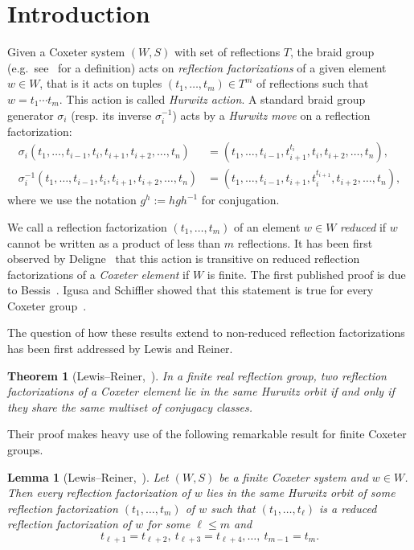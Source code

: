 \documentclass[10pt]{article}
\newtheorem*{thm*}{Theorem}
\newtheorem{lemma}[theorem]{Lemma}
\theoremstyle{definition}
\providecommand{\eg}{e.g.\ }
\begin{document}
\section{Introduction}\label{sec:intro}


Given a Coxeter system $(W,S)$ with set of reflections $T$, the braid group (\eg see~\cite{BDSW14} for a definition) acts on \emph{reflection factorizations} of a given element $w \in W$, that is it acts on tuples $(t_1, \ldots , t_m) \in T^m$ of reflections such that $w=t_1 \cdots t_m$. This action is called \emph{Hurwitz action}. A standard braid group generator $\sigma_i$ (resp. its inverse $\sigma_i^{-1}$) acts by a \emph{Hurwitz move} on a reflection factorization:
\begin{align*}
\sigma_i (t_1, \ldots , t_{i-1}, t_i, t_{i+1}, t_{i+2}, \ldots , t_n) & = (t_1, \ldots , t_{i-1}, t_{i+1}^{t_i}, t_{i}, t_{i+2}, \ldots , t_n),\\
\sigma_i^{-1} (t_1, \ldots , t_{i-1}, t_i, t_{i+1}, t_{i+2}, \ldots , t_n) & = (t_1, \ldots , t_{i-1}, t_{i+1}, t_{i}^{t_{i+1}}, t_{i+2}, \ldots , t_n),
\end{align*}
where we use the notation $g^h:=hgh^{-1}$ for conjugation. 

We call a reflection factorization $(t_1, \ldots , t_m)$ of an element $w \in W$ \emph{reduced} if $w$ cannot be written as a product of less than $m$ reflections. It has been first observed by Deligne~\cite{Del} that this action is transitive on reduced reflection factorizations of a \emph{Coxeter element} if $W$ is finite. The first published proof is due to Bessis~\cite[Proposition~1.6.1]{Bes03}. Igusa and Schiffler showed that this statement is true for every Coxeter group~\cite[Theorem~1.4]{IS10}. 

The question of how these results extend to non-reduced reflection factorizations has been first addressed by Lewis and Reiner.

\begin{thm*}
[{Lewis--Reiner,~\cite[Theorem~1.1]{LR16}}] In a finite real reflection group, two reflection factorizations of a Coxeter element lie in the same Hurwitz orbit if and only if they share the same multiset of conjugacy classes.
\end{thm*}

Their proof makes heavy use of the following remarkable result for finite Coxeter groups.
\begin{lemma}[{Lewis--Reiner,~\cite[Corollary~1.4]{LR16}}] \label{lem:LewisR}
Let $(W,S)$ be a finite Coxeter system and $w\in W$. Then every reflection factorization of $w$ lies in the same Hurwitz orbit of some reflection factorization $(t_1, \ldots , t_m)$ of $w$ such that $(t_1, \ldots , t_{\ell})$ is a reduced reflection factorization of $w$ for some $\ell \leq m$ and 
\[
t_{\ell +1} = t_{\ell+2}, ~t_{\ell+3} = t_{\ell+4}, \ldots, ~t_{m-1}=t_m.
\]
\end{lemma}
\end{document}
